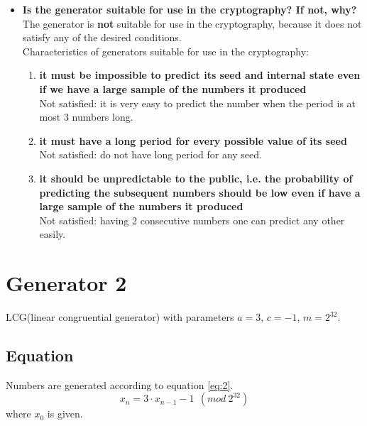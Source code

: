 \documentclass[a4paper,10pt]{article}
\begin{document}
\begin{itemize}
 \item \textbf{Is the generator suitable for use in the cryptography? If not, why?} \\
  The generator is \textbf{not} suitable for use in the cryptography, because it does not satisfy any of the desired conditions.\\
 Characteristics of generators suitable for use in the cryptography:
  \begin{enumerate}
   \item \textbf{it must be impossible to predict its seed and internal state even if we have a large sample of the numbers it produced} \\
   Not satisfied: it is very easy to predict the number when the period is at most 3 numbers long.
   \item \textbf{it must have a long period for every possible value of its seed} \\
   Not satisfied: do not have long period for any seed.
   \item \textbf{it should be unpredictable to the public, i.e. the probability of predicting the subsequent numbers should be low even if have a large sample of the numbers it produced} \\
   Not satisfied: having 2 consecutive numbers one can predict any other easily.
   \end{enumerate}

\end{itemize}

\section{Generator 2}
LCG(linear congruential generator) with parameters $a=3$, $c=-1$, $m=2^{32}$.
\subsection{Equation}
Numbers are generated according to equation \ref{eq:2}.
\begin{equation}
\label{eq:2}
  x_n = 3 \cdot x_{n-1} - 1\ \ (mod\ 2^{32}) 
\end{equation}
where ${x_0}$ is given. \\
\end{document}
